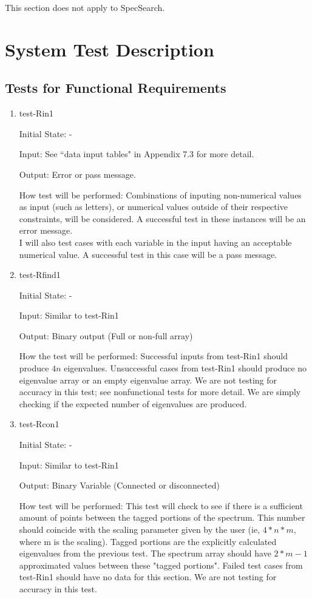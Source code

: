 \documentclass[12pt, titlepage]{article}
\begin{document}
This section does not apply to SpecSearch. 

\section{System Test Description}
	
\subsection{Tests for Functional Requirements}

\begin{enumerate}
\item{test-Rin1\\}	
				
Initial State: -
					
Input: See ``data input tables" in Appendix 7.3 for more detail.
					
Output: Error or pass message.
					
How test will be performed: Combinations of inputing non-numerical values as 
input  (such as letters), or numerical values outside of their respective 
constraints, will be considered. A successful test in these instances will be 
an error message. \\
I will also test cases with each variable in the input having an 
acceptable numerical value. A successful test in this case will be a pass 
message. 
					
\item{test-Rfind1} 

Initial State: - 

Input: Similar to test-Rin1

Output: Binary output (Full or non-full array)

How the test will be performed: Successful inputs from test-Rin1 should produce 
$4n$ eigenvalues. Unsuccessful cases 
from test-Rin1 should produce no eigenvalue array 
or an empty eigenvalue array. We are not testing for accuracy in this test; see 
nonfunctional tests for more detail. We are simply checking if the expected 
number of eigenvalues are produced.

\item{test-Rcon1} 

Initial State: -

Input: Similar to test-Rin1

Output: Binary Variable (Connected or disconnected)

How test will be performed: This test will check to see if there is a 
sufficient amount of points between the tagged portions of the spectrum. This 
number should coincide with the scaling parameter given by the user (ie, 
$4*n*m$, where m is the scaling). Tagged 
portions are the explicitly calculated eigenvalues from the previous test. The 
spectrum array should have $2*m-1$ approximated values between these "tagged 
portions". 
Failed test cases from test-Rin1 should have no data for this section. 
We are not testing for accuracy in this test. 


\end{enumerate}
\end{document}
